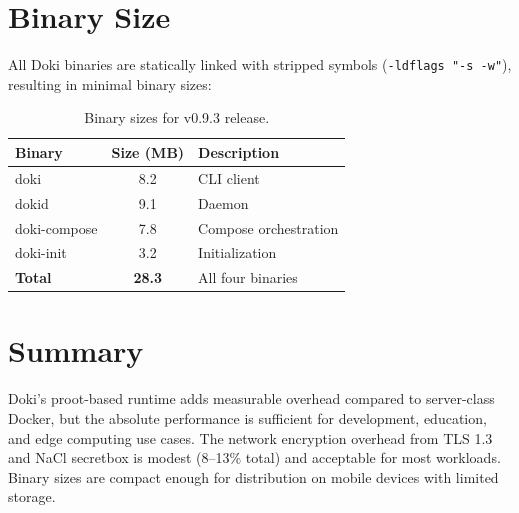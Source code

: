 \section{Binary Size}
\label{sec:binary-size}

All Doki binaries are statically linked with stripped symbols
(\texttt{-ldflags "-s -w"}), resulting in minimal binary sizes:

\begin{table}[htbp]
  \centering
  \caption{Binary sizes for v0.9.3 release.}
  \label{tab:binary-sizes}
  \begin{tabularx}{\textwidth}{l S[table-format=3.0] X}
    \toprule
    \textbf{Binary} & {\textbf{Size (MB)}} & \textbf{Description} \\
    \midrule
    doki           & 8.2  & CLI client \\
    dokid          & 9.1  & Daemon \\
    doki-compose   & 7.8  & Compose orchestration \\
    doki-init      & 3.2  & Initialization \\
    \midrule
    \textbf{Total} & \textbf{28.3} & All four binaries \\
    \bottomrule
  \end{tabularx}
\end{table}

\section{Summary}
\label{sec:metrics-summary}

Doki's proot-based runtime adds measurable overhead compared to
server-class Docker, but the absolute performance is sufficient for
development, education, and edge computing use cases. The network
encryption overhead from TLS 1.3 and NaCl secretbox is modest
(8--13\% total) and acceptable for most workloads. Binary sizes
are compact enough for distribution on mobile devices with limited
storage.
